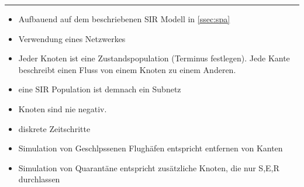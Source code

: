 \hrule
\begin{itemize}
	\item Aufbauend auf dem beschriebenen SIR Modell in \ref{ssec:spa}
	\item Verwendung eines Netzwerkes
	\item Jeder Knoten ist eine Zustandspopulation (Terminus festlegen). Jede Kante beschreibt einen Fluss von einem Knoten zu einem Anderen.
	\item eine SIR Population ist demnach ein Subnetz
	\item Knoten sind nie negativ. 
	\item diskrete Zeitschritte
	\item Simulation von Geschlpssenen Flughäfen entspricht entfernen von Kanten
	\item Simulation von Quarantäne entspricht zusätzliche Knoten, die nur S,E,R durchlassen
\end{itemize}